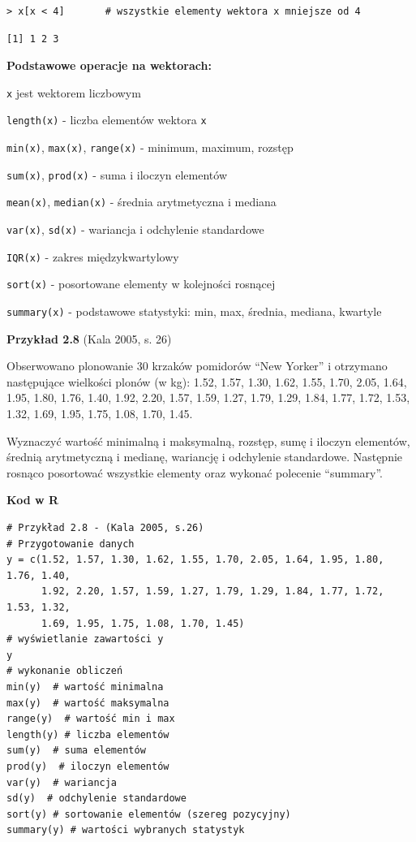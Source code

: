 \documentclass[12pt,B5paper,]{book}
\begin{document}
\begin{verbatim}
> x[x < 4]       # wszystkie elementy wektora x mniejsze od 4
\end{verbatim}

\begin{verbatim}
[1] 1 2 3
\end{verbatim}

\vspace{0.8cm} \textbf{Podstawowe operacje na wektorach: }

\texttt{x} jest wektorem liczbowym

\texttt{length(x)} - liczba elementów wektora \texttt{x}

\texttt{min(x)}, \texttt{max(x)}, \texttt{range(x)} - minimum, maximum,
rozstęp

\texttt{sum(x)}, \texttt{prod(x)} - suma i iloczyn elementów

\texttt{mean(x)}, \texttt{median(x)} - średnia arytmetyczna i mediana

\texttt{var(x)}, \texttt{sd(x)} - wariancja i odchylenie standardowe

\texttt{IQR(x)} - zakres międzykwartylowy

\texttt{sort(x)} - posortowane elementy w kolejności rosnącej

\texttt{summary(x)} - podstawowe statystyki: min, max, średnia, mediana,
kwartyle

\vspace{0.8cm} \textbf{Przykład 2.8} (Kala 2005, s. 26)

Obserwowano plonowanie 30 krzaków pomidorów ``New Yorker'' i otrzymano
następujące wielkości plonów (w kg): 1.52, 1.57, 1.30, 1.62, 1.55, 1.70,
2.05, 1.64, 1.95, 1.80, 1.76, 1.40, 1.92, 2.20, 1.57, 1.59, 1.27, 1.79,
1.29, 1.84, 1.77, 1.72, 1.53, 1.32, 1.69, 1.95, 1.75, 1.08, 1.70, 1.45.

Wyznaczyć wartość minimalną i maksymalną, rozstęp, sumę i iloczyn
elementów, średnią arytmetyczną i medianę, wariancję i odchylenie
standardowe. Następnie rosnąco posortować wszystkie elementy oraz
wykonać polecenie ``summary''.

\vspace{0.8cm}

\textbf{Kod w R}

\begin{verbatim}
# Przykład 2.8 - (Kala 2005, s.26)
# Przygotowanie danych
y = c(1.52, 1.57, 1.30, 1.62, 1.55, 1.70, 2.05, 1.64, 1.95, 1.80, 1.76, 1.40,
      1.92, 2.20, 1.57, 1.59, 1.27, 1.79, 1.29, 1.84, 1.77, 1.72, 1.53, 1.32,
      1.69, 1.95, 1.75, 1.08, 1.70, 1.45) 
# wyświetlanie zawartości y
y
# wykonanie obliczeń
min(y)  # wartość minimalna 
max(y)  # wartość maksymalna
range(y)  # wartość min i max
length(y) # liczba elementów
sum(y)  # suma elementów 
prod(y)  # iloczyn elementów 
var(y)  # wariancja
sd(y)  # odchylenie standardowe
sort(y) # sortowanie elementów (szereg pozycyjny)
summary(y) # wartości wybranych statystyk
\end{verbatim}
\end{document}
